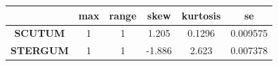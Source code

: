 \begin{longtable}[]{@{}cccccc@{}}
\toprule
\begin{minipage}[b]{0.16\columnwidth}\centering\strut
~\strut
\end{minipage} & \begin{minipage}[b]{0.07\columnwidth}\centering\strut
max\strut
\end{minipage} & \begin{minipage}[b]{0.09\columnwidth}\centering\strut
range\strut
\end{minipage} & \begin{minipage}[b]{0.10\columnwidth}\centering\strut
skew\strut
\end{minipage} & \begin{minipage}[b]{0.13\columnwidth}\centering\strut
kurtosis\strut
\end{minipage} & \begin{minipage}[b]{0.13\columnwidth}\centering\strut
se\strut
\end{minipage}\tabularnewline
\midrule
\endhead
\begin{minipage}[t]{0.16\columnwidth}\centering\strut
\textbf{SCUTUM}\strut
\end{minipage} & \begin{minipage}[t]{0.07\columnwidth}\centering\strut
1\strut
\end{minipage} & \begin{minipage}[t]{0.09\columnwidth}\centering\strut
1\strut
\end{minipage} & \begin{minipage}[t]{0.10\columnwidth}\centering\strut
1.205\strut
\end{minipage} & \begin{minipage}[t]{0.13\columnwidth}\centering\strut
0.1296\strut
\end{minipage} & \begin{minipage}[t]{0.13\columnwidth}\centering\strut
0.009575\strut
\end{minipage}\tabularnewline
\begin{minipage}[t]{0.16\columnwidth}\centering\strut
\textbf{STERGUM}\strut
\end{minipage} & \begin{minipage}[t]{0.07\columnwidth}\centering\strut
1\strut
\end{minipage} & \begin{minipage}[t]{0.09\columnwidth}\centering\strut
1\strut
\end{minipage} & \begin{minipage}[t]{0.10\columnwidth}\centering\strut
-1.886\strut
\end{minipage} & \begin{minipage}[t]{0.13\columnwidth}\centering\strut
2.623\strut
\end{minipage} & \begin{minipage}[t]{0.13\columnwidth}\centering\strut
0.007378\strut
\end{minipage}\tabularnewline
\bottomrule
\end{longtable}

